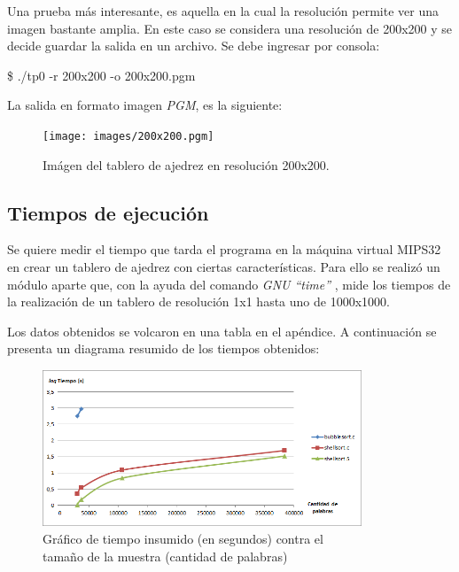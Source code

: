 \documentclass{article}
\begin{document}
	\par
	Una prueba más interesante, es aquella en la cual la resolución permite ver una imagen bastante amplia. En este caso se considera una resolución de 200x200 y se decide guardar la salida en un archivo. Se debe ingresar por consola:
	\smallskip

{\ttfamily\footnotesize
\indent \$ ./tp0 -r 200x200 -o 200x200.pgm\\}
\smallskip

	La salida en formato imagen \textit{PGM}, es la siguiente:

\begin{figure}[H]
	\centering
	\texttt{[image: images/200x200.pgm]}
	\medskip
	\caption{Imágen del tablero de ajedrez en resolución 200x200.}
\end{figure}
\bigskip\bigskip


\subsection{Tiempos de ejecución}

	\par
	Se quiere medir el tiempo que tarda el programa en la máquina virtual MIPS32 en crear un tablero de ajedrez con ciertas características. Para ello se realizó un módulo aparte que, con la ayuda del comando \textit{GNU ``time''} \cite{TIME}, mide los tiempos de la realización de un tablero de resolución 1x1 hasta uno de 1000x1000. 
	\par
	Los datos obtenidos se volcaron en una tabla en el apéndice. A continuación se presenta un diagrama resumido de los tiempos obtenidos:
\bigskip

\begin{figure}[h]
	\centering
	\includegraphics[width=0.85\textwidth]{images/imagen01.png}
	\medskip
	\caption{Gráfico de tiempo insumido (en segundos)  contra el\\ tamaño de la muestra (cantidad de palabras)}
\end{figure}
\end{document}
